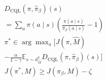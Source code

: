 \documentclass[border=7pt]{standalone}
\begin{document}
\color{ink}
$\displaystyle \begin{gathered}D_{\mathrm{CQL}}(\pi,\widehat\pi_\beta)(s)\\ =\sum_a\pi(a\mid s)\!\left(\frac{\pi(a\mid s)}{\widehat\pi_\beta(a\mid s)}-1\right)\\ \pi^*\in\arg\max_\pi\Big[J(\pi,\widehat M)\\ -\frac{\alpha}{1-\gamma}\mathbb E_{s\sim d_{\widehat M}^{\pi}}D_{\mathrm{CQL}}(\pi,\widehat\pi_\beta)(s)\Big]\\ J(\pi^*,M)\geq J(\widehat\pi_\beta,M)-\zeta\end{gathered}$
\end{document}
